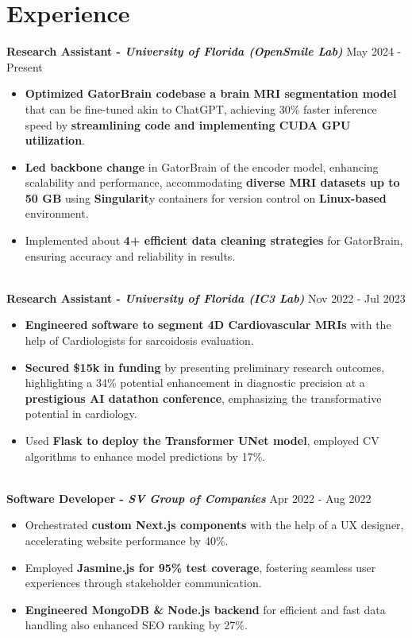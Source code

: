 \documentclass[a4paper,10pt]{article}
\begin{document}
\vspace{-10pt}
\section*{Experience}
\vspace{-3pt}
\textbf{Research Assistant - \textit{University of Florida (OpenSmile Lab)}}  
\hfill May 2024 - Present
\begin{itemize}
\item \textbf{Optimized GatorBrain codebase a brain MRI segmentation model} that can be fine-tuned akin to ChatGPT, achieving 30\% faster inference speed by \textbf{streamlining code and implementing CUDA GPU utilization}.
\item \textbf{Led backbone change} in GatorBrain of the encoder model, enhancing scalability and performance, accommodating \textbf{diverse MRI datasets up to 50 GB} using \textbf{Singularit}y containers for version control on \textbf{Linux-based} environment.
\item Implemented about \textbf{4+ efficient data cleaning strategies} for GatorBrain, ensuring accuracy and reliability in results.
\end{itemize}
\vspace{-8pt}
\textbf{\\ Research Assistant - \textit{University of Florida (IC3 Lab)}} \hfill Nov 2022 - Jul 2023
    \begin{itemize}
        \item \textbf{Engineered software to segment 4D Cardiovascular MRIs} with the help of Cardiologists for sarcoidosis evaluation.
        \item \textbf{Secured \$15k in funding} by presenting preliminary research outcomes, highlighting a 34\% potential enhancement in diagnostic precision at a \textbf{prestigious AI datathon conference}, emphasizing the transformative potential in cardiology.
        \item Used \textbf{Flask to deploy the Transformer UNet model}, employed CV algorithms to enhance model predictions by 17\%.
    \end{itemize}
\vspace{-8pt}
\textbf{\\ Software  Developer - \textit{SV Group of Companies}} \hfill Apr 2022 - Aug 2022
    \begin{itemize}
    \item Orchestrated \textbf{custom Next.js components} with the help of a UX designer, accelerating website performance by 40\%.
    \item Employed \textbf{Jasmine.js for 95\% test coverage}, fostering seamless user experiences through stakeholder communication.
    \item \textbf{Engineered MongoDB \& Node.js backend} for efficient and fast data handling also enhanced SEO ranking by 27\%.
    \end{itemize}
\end{document}
